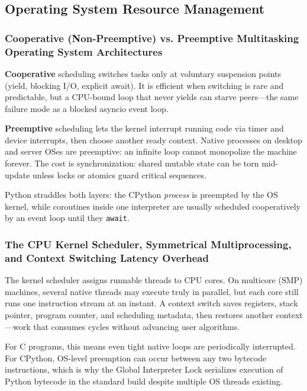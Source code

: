 \documentclass[a4paper,twoside]{report}
\begin{document}
\subsection{Operating System Resource Management}

\subsubsection{Cooperative (Non-Preemptive) vs. Preemptive Multitasking Operating System Architectures}

\textbf{Cooperative} scheduling switches tasks only at voluntary suspension points (yield, blocking I/O, explicit await). It is efficient when switching is rare and predictable, but a CPU-bound loop that never yields can starve peers---the same failure mode as a blocked asyncio event loop.

\textbf{Preemptive} scheduling lets the kernel interrupt running code via timer and device interrupts, then choose another ready context. Native processes on desktop and server OSes are preemptive: an infinite loop cannot monopolize the machine forever. The cost is synchronization: shared mutable state can be torn mid-update unless locks or atomics guard critical sequences.

Python straddles both layers: the CPython \emph{process} is preempted by the OS kernel, while coroutines inside one interpreter are usually scheduled cooperatively by an event loop until they \texttt{await}.

\subsubsection{The CPU Kernel Scheduler, Symmetrical Multiprocessing, and Context Switching Latency Overhead}

The kernel scheduler assigns runnable threads to CPU cores. On multicore (SMP) machines, several native threads may execute truly in parallel, but each core still runs one instruction stream at an instant. A context switch saves registers, stack pointer, program counter, and scheduling metadata, then restores another context---work that consumes cycles without advancing user algorithms.

For C programs, this means even tight native loops are periodically interrupted. For CPython, OS-level preemption can occur between any two bytecode instructions, which is why the Global Interpreter Lock serializes execution of Python bytecode in the standard build despite multiple OS threads existing.
\end{document}
